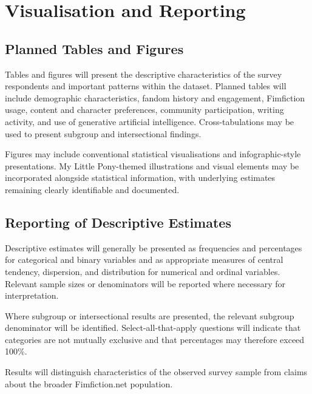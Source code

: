 \section{Visualisation and Reporting}

\subsection{Planned Tables and Figures}

Tables and figures will present the descriptive characteristics of the survey respondents and important patterns within the dataset. Planned tables will include demographic characteristics, fandom history and engagement, Fimfiction usage, content and character preferences, community participation, writing activity, and use of generative artificial intelligence. Cross-tabulations may be used to present subgroup and intersectional findings.

Figures may include conventional statistical visualisations and infographic-style presentations. My Little Pony-themed illustrations and visual elements may be incorporated alongside statistical information, with underlying estimates remaining clearly identifiable and documented.


\subsection{Reporting of Descriptive Estimates}

Descriptive estimates will generally be presented as frequencies and percentages for categorical and binary variables and as appropriate measures of central tendency, dispersion, and distribution for numerical and ordinal variables. Relevant sample sizes or denominators will be reported where necessary for interpretation.

Where subgroup or intersectional results are presented, the relevant subgroup denominator will be identified. Select-all-that-apply questions will indicate that categories are not mutually exclusive and that percentages may therefore exceed 100\%.

Results will distinguish characteristics of the observed survey sample from claims about the broader Fimfiction.net population.


